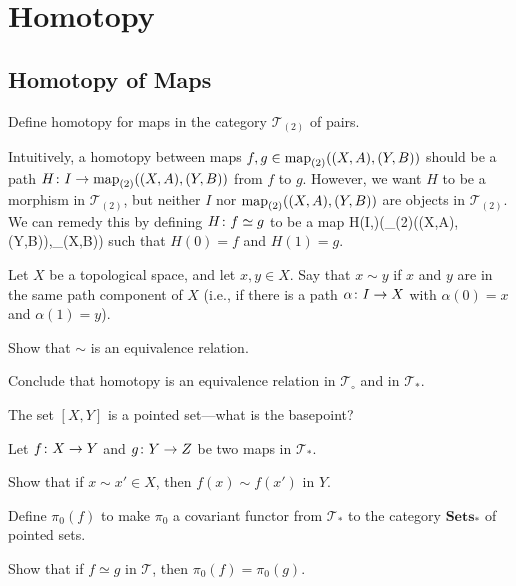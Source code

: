 \chapter{Homotopy}

\section{Homotopy of Maps}

\bx
Define homotopy for maps in the category $\mathcal{T}_{(2)}$ of pairs.
\ex

\bs
Intuitively, a homotopy between maps $f,g\in\operatorname{map}_{(2)}((X,A),(Y,B))$ should be a path $H\colon I\to\operatorname{map}_{(2)}((X,A),(Y,B))$ from $f$ to $g$. However, we want $H$ to be a morphism in $\mathcal{T}_{(2)}$, but neither $I$ nor $\operatorname{map}_{(2)}((X,A),(Y,B))$ are objects in $\mathcal{T}_{(2)}$. We can remedy this by defining $H\colon f\simeq g$ to be a map
\bse
H\cl (I,\vn)\longrightarrow (\map_{(2)}((X,A),(Y,B)),\map_{\circ}(X,B))
\ese
such that $H(0)=f$ and $H(1)=g$.
\es

\bp
Let $X$ be a topological space, and let $x, y \in X$. Say that $x \sim y$ if $x$ and $y$ are in the same path component of $X$ (i.e., if there is a path $\alpha \colon I \to X$ with $\alpha(0) = x$ and $\alpha(1) = y$).
\ben[label=(\alph*)]
\item Show that $\sim$ is an equivalence relation.
\item Conclude that homotopy is an equivalence relation in $\mathcal{T}_{\circ}$ and in $\mathcal{T}_*$.
\een
\ep

\bs
\ben[label=(\alph*)]
\item 
\item 
\een
\es

\bx
The set $[X, Y ]$ is a pointed set---what is the basepoint?
\ex

\bs
\es

\bp
Let $f \colon X \to Y$ and $g \colon Y \to Z$ be two maps in $\mathcal{T}_*$.
\ben[label=(\alph*)]
\item Show that if $x \sim x' \in X$, then $f(x) \sim f(x')$ in $Y$.
\item Define $\pi_0(f)$ to make $\pi_0$ a covariant functor from $\mathcal{T}_*$ to the category $\mathbf{Sets}_*$ of pointed sets.
\item Show that if $f \simeq g$ in $\mathcal{T}$, then $\pi_0(f) = \pi_0(g)$.
\een
\ep

\bs
\ben[label=(\alph*)]
\item 
\item 
\item 
\een
\es

